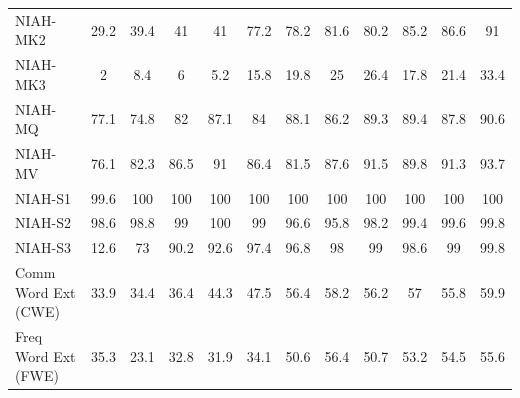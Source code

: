 \begin{table}[ht]
\begin{tabular}{l|ccccc|ccccc|c}
NIAH-MK2 & \cellcolor{myred!90} 29.2 & \cellcolor{myred!75} 39.4 & \cellcolor{myred!73} 41 & \cellcolor{myred!73} 41 & \cellcolor{myred!20} 77.2 & \cellcolor{myred!19} 78.2 & \cellcolor{myred!14} 81.6 & \cellcolor{myred!16} 80.2 & \cellcolor{myred!8} 85.2 & \cellcolor{myred!6} 86.6 & 91 \\
NIAH-MK3 & \cellcolor{myred!90} 2 & \cellcolor{myred!72} 8.4 & \cellcolor{myred!79} 6 & \cellcolor{myred!81} 5.2 & \cellcolor{myred!50} 15.8 & \cellcolor{myred!39} 19.8 & \cellcolor{myred!24} 25 & \cellcolor{myred!20} 26.4 & \cellcolor{myred!45} 17.8 & \cellcolor{myred!34} 21.4 & 33.4 \\
NIAH-MQ & \cellcolor{myred!76} 77.1 & \cellcolor{myred!90} 74.8 & \cellcolor{myred!49} 82 & \cellcolor{myred!20} 87.1 & \cellcolor{myred!37} 84 & \cellcolor{myred!14} 88.1 & \cellcolor{myred!25} 86.2 & \cellcolor{myred!7} 89.3 & \cellcolor{myred!7} 89.4 & \cellcolor{myred!16} 87.8 & 90.6 \\
NIAH-MV & \cellcolor{myred!90} 76.1 & \cellcolor{myred!58} 82.3 & \cellcolor{myred!37} 86.5 & \cellcolor{myred!13} 91 & \cellcolor{myred!37} 86.4 & \cellcolor{myred!62} 81.5 & \cellcolor{myred!31} 87.6 & \cellcolor{myred!11} 91.5 & \cellcolor{myred!20} 89.8 & \cellcolor{myred!12} 91.3 & 93.7 \\
NIAH-S1 & \cellcolor{myred!90} 99.6 & 100 & 100 & 100 & 100 & 100 & 100 & 100 & 100 & 100 & 100 \\
NIAH-S2 & \cellcolor{myred!27} 98.6 & \cellcolor{myred!22} 98.8 & \cellcolor{myred!18} 99 & \cellcolor{royalblue!5} 100 & \cellcolor{myred!18} 99 & \cellcolor{myred!72} 96.6 & \cellcolor{myred!90} 95.8 & \cellcolor{myred!36} 98.2 & \cellcolor{myred!9} 99.4 & \cellcolor{myred!5} 99.6 & 99.8 \\
NIAH-S3 & \cellcolor{myred!90} 12.6 & \cellcolor{myred!28} 73 & \cellcolor{myred!10} 90.2 & \cellcolor{myred!7} 92.6 & \cellcolor{myred!2} 97.4 & \cellcolor{myred!3} 96.8 & \cellcolor{myred!2} 98 & \cellcolor{myred!1} 99 & \cellcolor{myred!1} 98.6 & \cellcolor{myred!1} 99 & 99.8 \\
Comm Word Ext (CWE) & \cellcolor{myred!90} 33.9 & \cellcolor{myred!88} 34.4 & \cellcolor{myred!81} 36.4 & \cellcolor{myred!54} 44.3 & \cellcolor{myred!43} 47.5 & \cellcolor{myred!12} 56.4 & \cellcolor{myred!6} 58.2 & \cellcolor{myred!13} 56.2 & \cellcolor{myred!10} 57 & \cellcolor{myred!14} 55.8 & 59.9 \\
Freq Word Ext (FWE) & \cellcolor{myred!56} 35.3 & \cellcolor{myred!90} 23.1 & \cellcolor{myred!63} 32.8 & \cellcolor{myred!65} 31.9 & \cellcolor{myred!60} 34.1 & \cellcolor{myred!14} 50.6 & \cellcolor{royalblue!2} 56.4 & \cellcolor{myred!14} 50.7 & \cellcolor{myred!7} 53.2 & \cellcolor{myred!3} 54.5 & 55.6 \\

\end{tabular}
\end{table}
